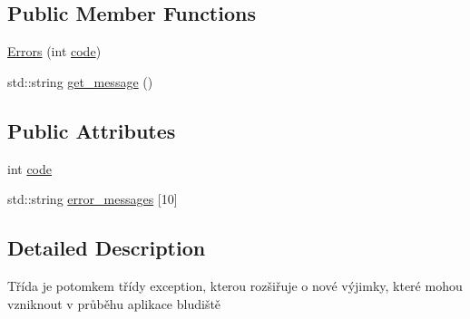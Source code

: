 \subsection*{Public Member Functions}
\begin{DoxyCompactItemize}
\item 
\hyperlink{classErrors_a3a2481d800ce1b4000995ba0005613e9}{Errors} (int \hyperlink{classErrors_ab886b164554b2094ff8263917cfcaaae}{code})
\item 
std\-::string \hyperlink{classErrors_afed158318501890c617c04a9ec2aa9f4}{get\-\_\-message} ()
\end{DoxyCompactItemize}
\subsection*{Public Attributes}
\begin{DoxyCompactItemize}
\item 
int \hyperlink{classErrors_ab886b164554b2094ff8263917cfcaaae}{code}
\item 
std\-::string \hyperlink{classErrors_abce2313e24596b78f074bc3a31ae5dab}{error\-\_\-messages} \mbox{[}10\mbox{]}
\end{DoxyCompactItemize}


\subsection{Detailed Description}
Třída je potomkem třídy exception, kterou rozšiřuje o nové výjimky, které mohou vzniknout v průběhu aplikace bludiště 

